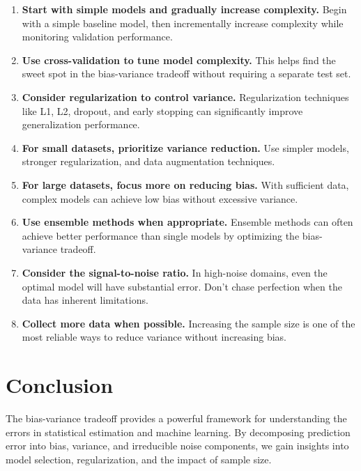 \documentclass{article}
\begin{document}
\begin{enumerate}
\item \textbf{Start with simple models and gradually increase complexity.} Begin with a simple baseline model, then incrementally increase complexity while monitoring validation performance.

\item \textbf{Use cross-validation to tune model complexity.} This helps find the sweet spot in the bias-variance tradeoff without requiring a separate test set.

\item \textbf{Consider regularization to control variance.} Regularization techniques like L1, L2, dropout, and early stopping can significantly improve generalization performance.

\item \textbf{For small datasets, prioritize variance reduction.} Use simpler models, stronger regularization, and data augmentation techniques.

\item \textbf{For large datasets, focus more on reducing bias.} With sufficient data, complex models can achieve low bias without excessive variance.

\item \textbf{Use ensemble methods when appropriate.} Ensemble methods can often achieve better performance than single models by optimizing the bias-variance tradeoff.

\item \textbf{Consider the signal-to-noise ratio.} In high-noise domains, even the optimal model will have substantial error. Don't chase perfection when the data has inherent limitations.

\item \textbf{Collect more data when possible.} Increasing the sample size is one of the most reliable ways to reduce variance without increasing bias.
\end{enumerate}

\section{Conclusion}

The bias-variance tradeoff provides a powerful framework for understanding the errors in statistical estimation and machine learning. By decomposing prediction error into bias, variance, and irreducible noise components, we gain insights into model selection, regularization, and the impact of sample size.
\end{document}
